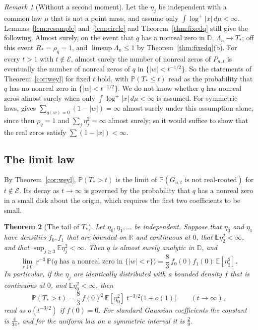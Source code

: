 \documentclass[11pt]{amsart}
\newtheorem{theorem}{Theorem}[section]
\theoremstyle{definition}
\theoremstyle{remark}
\newtheorem{remark}[theorem]{Remark}
\numberwithin{equation}{section}
\newcommand{\R}{\mathbb{R}}
\newcommand{\D}{\mathbb{D}}
\newcommand{\E}{\mathbb{E}}
\newcommand{\PP}{\mathbb{P}}
\begin{document}
\begin{remark}[Without a second moment]\label{rem:logmoment}
Let the $\eta_j$ be independent with a common law $\mu$ that is not a point mass, and assume only $\int\log^+|x|\,d\mu<\infty$. Lemmas~\ref{lem:resample} and~\ref{lem:circle} and Theorem~\ref{thm:fixedq} still give the following. Almost surely, on the event that $q$ has a nonreal zero in $\D$, $\Lambda_n\to T_*$; off this event $R_*=\rho_q=1$, and $\limsup\Lambda_n\le1$ by Theorem~\ref{thm:fixedq}(b). For every $t>1$ with $t\notin\mathcal E$, almost surely the number of nonreal zeros of $P_{n,t}$ is eventually the number of nonreal zeros of $q$ in $\{|w|<t^{-1/2}\}$. So the statements of Theorem~\ref{cor:weyl} for fixed $t$ hold, with $\PP(T_*\le t)$ read as the probability that $q$ has no nonreal zero in $\{|w|<t^{-1/2}\}$. We do not know whether $q$ has nonreal zeros almost surely when only $\int\log^+|x|\,d\mu<\infty$ is assumed. For symmetric laws, \cite[Theorem~1.3]{NNS} gives $\sum_{q(w)=0}(1-|w|)=\infty$ almost surely under this assumption alone, since then $\rho_q=1$ and $\sum_j\eta_j^2=\infty$ almost surely; so it would suffice to show that the real zeros satisfy $\sum(1-|x|)<\infty$.
\end{remark}

\subsection{The limit law}

By Theorem~\ref{cor:weyl}, $\PP(T_*>t)$ is the limit of $\PP(G_{n,t}\text{ is not real-rooted})$ for $t\notin\mathcal E$. Its decay as $t\to\infty$ is governed by the probability that $q$ has a nonreal zero in a small disk about the origin, which requires the first two coefficients to be small.

\begin{theorem}[The tail of $T_*$]\label{thm:tail}
Let $\eta_0,\eta_1,\dots$ be independent. Suppose that $\eta_0$ and $\eta_1$ have densities $f_0,f_1$ that are bounded on $\R$ and continuous at $0$, that $\E\eta_2^2<\infty$, and that $\sup_{j\ge3}\E\eta_j^2<\infty$. Then $q$ is almost surely analytic in $\D$, and
\[
\lim_{r\downarrow0}\ r^{-3}\,\PP\bigl(q\text{ has a nonreal zero in }\{|w|<r\}\bigr)=\frac83\,f_0(0)f_1(0)\,\E[\eta_2^2].
\]
In particular, if the $\eta_j$ are identically distributed with a bounded density $f$ that is continuous at $0$, and $\E\eta_0^2<\infty$, then
\[
\PP(T_*>t)=\frac83\,f(0)^2\,\E[\eta_0^2]\;t^{-3/2}\bigl(1+o(1)\bigr)\qquad(t\to\infty),
\]
read as $o(t^{-3/2})$ if $f(0)=0$. For standard Gaussian coefficients the constant is $\frac4{3\pi}$, and for the uniform law on a symmetric interval it is $\frac29$.
\end{theorem}
\end{document}
